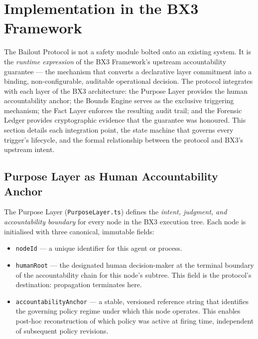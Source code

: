 
\section{Implementation in the BX3 Framework}
\label{sec:bailout-implementation}

The Bailout Protocol is not a safety module bolted onto an existing system.
It is the \emph{runtime expression} of the BX3 Framework's upstream accountability
guarantee --- the mechanism that converts a declarative layer commitment into a
binding, non-configurable, auditable operational decision.  The protocol integrates
with each layer of the BX3 architecture: the Purpose Layer provides the human
accountability anchor; the Bounds Engine serves as the exclusive triggering
mechanism; the Fact Layer enforces the resulting audit trail; and the Forensic
Ledger provides cryptographic evidence that the guarantee was honoured.  This
section details each integration point, the state machine that governs every
trigger's lifecycle, and the formal relationship between the protocol and BX3's
upstream intent.

\subsection{Purpose Layer as Human Accountability Anchor}

The Purpose Layer (\texttt{PurposeLayer.ts}) defines the \emph{intent, judgment,
and accountability boundary} for every node in the BX3 execution tree.  Each
node is initialised with three canonical, immutable fields:

\begin{itemize}
  \item \texttt{nodeId} --- a unique identifier for this agent or process.
  \item \texttt{humanRoot} --- the designated human decision-maker at the
        terminal boundary of the accountability chain for this node's subtree.
        This field is the protocol's destination: propagation terminates here.
  \item \texttt{accountabilityAnchor} --- a stable, versioned reference string
        that identifies the governing policy regime under which this node operates.
        This enables post-hoc reconstruction of which policy was active at
        firing time, independent of subsequent policy revisions.
\end{itemize}

